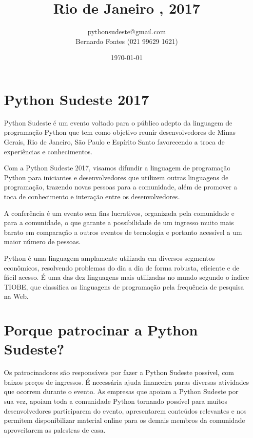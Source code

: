 \documentclass[12pt]{article}
\title{Rio de Janeiro , 2017}
\author{pythonsudeste@gmail.com \\ Bernardo Fontes (021 99629 1621)}
\date{\today}
\begin{document}
\maketitle


\section{Python Sudeste 2017}

Python Sudeste é um evento voltado para o público adepto da linguagem de programação Python que tem como objetivo reunir desenvolvedores de Minas Gerais, Rio de Janeiro, São Paulo e Espírito Santo favorecendo a troca de experiências e conhecimentos.

Com a Python Sudeste 2017, visamos difundir a linguagem de programação Python para iniciantes e desenvolvedores que utilizem outras linguagens de programação, trazendo novas pessoas para a comunidade, além de promover a toca de conhecimento e interação entre os desenvolvedores.

A conferência é um evento sem fins lucrativos, organizada pela comunidade e para a comunidade, o que garante a possibilidade de um ingresso muito mais barato em comparação a outros eventos de tecnologia e portanto acessível a um maior número de pessoas.

Python é uma linguagem amplamente utilizada em diversos segmentos econômicos, resolvendo problemas do dia a dia de forma robusta, eficiente e de fácil acesso. É uma das dez linguagens mais utilizadas no mundo segundo o índice TIOBE, que classifica as linguagens de programação pela frequência de pesquisa na Web.

\section{Porque patrocinar a Python Sudeste?}

Os patrocinadores são responsáveis por fazer a Python Sudeste possível, com baixos preços de ingressos. É necessária ajuda financeira paras diversas atividades que ocorrem durante o evento. As empresas que apoiam a Python Sudeste por sua vez, apoiam toda a comunidade Python tornando possível para muitos desenvolvedores participarem do evento, apresentarem conteúdos relevantes e nos permitem disponibilizar material online para os demais membros da comunidade aproveitarem as palestras de casa.
\end{document}
